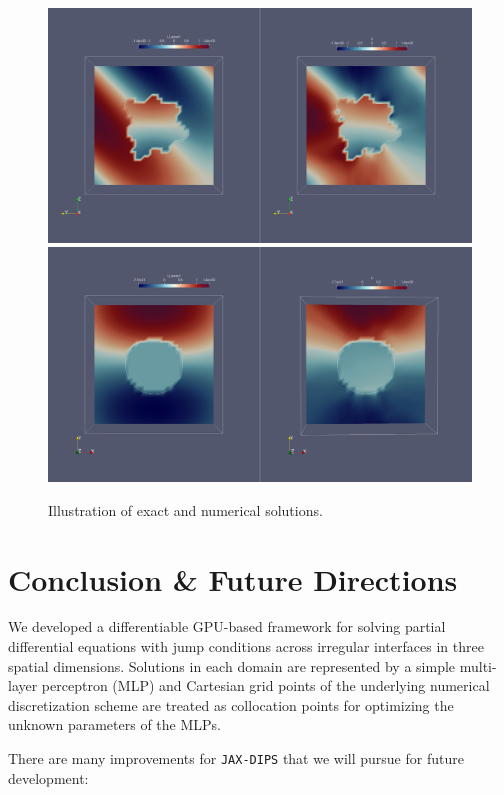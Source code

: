 \documentclass{elsarticle}
\begin{document}
\begin{figure}
	\centering
	\includegraphics[width=\linewidth]{./figures/star_sols.png}
	\includegraphics[width=\linewidth]{./figures/star_sols_z.png}
	\caption{Illustration of exact and numerical solutions.}
	\label{fig:star_sol}
\end{figure}




\section{Conclusion \& Future Directions}
We developed a differentiable GPU-based framework for solving partial differential equations with jump conditions across irregular interfaces in three spatial dimensions. Solutions in each domain are represented by a simple multi-layer perceptron (MLP) and Cartesian grid points of the underlying numerical discretization scheme are treated as collocation points for optimizing the unknown parameters of the MLPs. 


There are many improvements for \texttt{JAX-DIPS} that we will pursue for future development:
\end{document}
